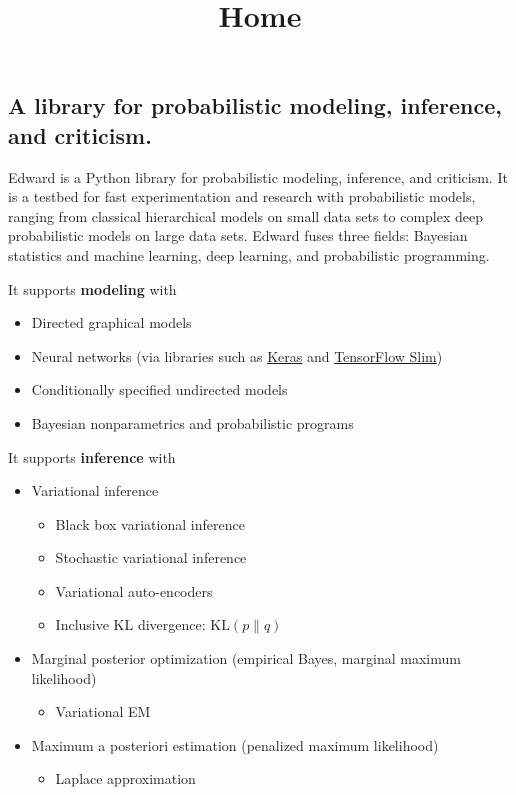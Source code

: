 \title{Home}

\subsection{A library for probabilistic modeling, inference, and criticism.}
Edward is a Python library for probabilistic modeling, inference, and
criticism. It is a testbed for fast experimentation and research with
probabilistic models, ranging from classical hierarchical models on
small data sets to complex deep probabilistic models on large data
sets. Edward fuses three fields: Bayesian statistics and machine
learning, deep learning, and probabilistic programming.


It supports \textbf{modeling} with
\begin{itemize}
\item Directed graphical models
\item Neural networks (via libraries such as
  \href{http://keras.io}{Keras} and
  \href{https://github.com/tensorflow/tensorflow/tree/master/tensorflow/contrib/slim}{TensorFlow
  Slim})
\item Conditionally specified undirected models
\item Bayesian nonparametrics and probabilistic programs
\end{itemize}

It supports \textbf{inference} with
\begin{itemize}
\item Variational inference
  \begin{itemize}
    \item Black box variational inference
    \item Stochastic variational inference
    \item Variational auto-encoders
    \item Inclusive KL divergence: $\text{KL}(p\|q)$
  \end{itemize}
\item Marginal posterior optimization (empirical Bayes, marginal maximum
likelihood)
  \begin{itemize}
    \item Variational EM
  \end{itemize}
\item Maximum a posteriori estimation (penalized maximum likelihood)
  \begin{itemize}
  \item Laplace approximation
  \end{itemize}
\end{itemize}

